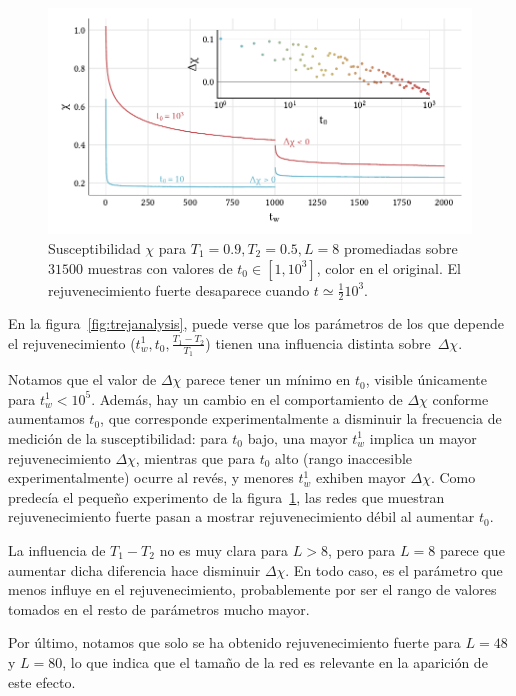 \documentclass[11pt]{report}
\begin{document}
\begin{figure}
  \centering
  \includegraphics{../study_cases/vanishingrejuvenation/trej.pdf}
  \caption{Susceptibilidad $χ$ para $T_1=0.9, T_2=0.5, L=8$
    promediadas sobre $31500$ muestras con valores de $t_0∈[1,10^3]$,
    color en el original. El rejuvenecimiento fuerte desaparece cuando
    $t ≃ \frac{1}{2} 10^3$.}
  \label{fig:vanishing}
\end{figure}


En la figura~\ref{fig:trejanalysis}, puede verse que los parámetros de
los que depende el rejuvenecimiento ($t_w^1, t_0,
\frac{T_1-T_2}{T_1}$) tienen una influencia distinta sobre~$Δχ$.

Notamos que el valor de $Δχ$ parece tener un mínimo en $t_0$, visible
únicamente para $t_w^1<10^5$. Además, hay un cambio en el
comportamiento de $Δχ$ conforme aumentamos $t_0$, que corresponde
experimentalmente a disminuir la frecuencia de medición de la
susceptibilidad: para $t_0$ bajo, una mayor $t_w^1$ implica un mayor
rejuvenecimiento $Δχ$, mientras que para $t_0$ alto (rango inaccesible
experimentalmente) ocurre al revés, y menores $t_w^1$ exhiben mayor
$Δχ$. Como predecía el pequeño experimento de la
figura~\ref{fig:vanishing}, las redes que muestran rejuvenecimiento
fuerte pasan a mostrar rejuvenecimiento débil al aumentar $t_0$.

La influencia de $T_1-T_2$ no es muy clara para $L>8$, pero para $L=8$
parece que aumentar dicha diferencia hace disminuir $Δχ$. En todo caso, es el
parámetro que menos influye en el rejuvenecimiento, probablemente por
ser el rango de valores tomados en el resto de parámetros mucho mayor.

Por último, notamos que solo se ha obtenido rejuvenecimiento fuerte
para $L=48$ y $L=80$, lo que indica que el tamaño de la red es
relevante en la aparición de este efecto.
\end{document}
